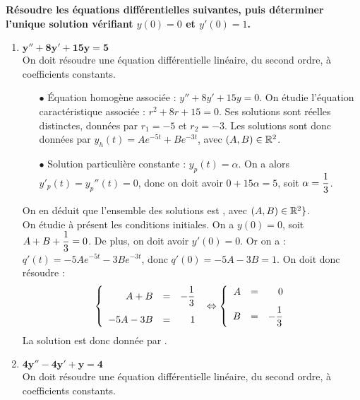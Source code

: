 \documentclass[a4paper, 11pt,reqno]{article}
\begin{document}
\begin{correction}  \;
  \textbf{R\'esoudre les \'equations diff\'erentielles suivantes, puis d\'eterminer l'unique solution v\'erifiant $y(0)=0$ et $y'(0)=1$.}
  \begin{enumerate}
    \item $\mathbf{y''+8y'+15y=5}$\\
          On doit r\'esoudre une \'equation diff\'erentielle lin\'eaire, du second ordre, \`a coefficients constants.
          \begin{itemize}
            \item[$\bullet$] \'Equation homog\`ene associ\'ee : $ y''+8y'+15y= 0$. On \'etudie l'\'equation caract\'eristique associ\'ee : $r^2 + 8r+15=0$. Ses solutions sont r\'eelles distinctes, donn\'ees par $r_1=-5$ et $r_2=-3$. Les solutions sont donc donn\'ees par $y_h(t) = A e^{-5t} + B e^{-3t}$, avec $(A,B) \in \mathbb{R}^2$.
            \item[$\bullet$] Solution particuli\`ere constante : $y_p(t) = \alpha$. On a alors $y'_p(t) = y_p''(t) = 0$, donc on doit avoir $0 +15 \alpha = 5$, soit $\alpha = \displaystyle \frac{1}{3}$.
          \end{itemize}
          On en d\'eduit que l'ensemble des solutions est , avec $(A,B) \in \mathbb{R}^2\}$.\\
          On \'etudie \`a pr\'esent les conditions initiales. On a $y(0) = 0$, soit $A+B+\displaystyle \frac{1}{3}=0$. De plus, on doit avoir $y'(0)=0$. Or on a : $q'(t) = - 5 A  e^{-5t} - 3 B e^{-3t}$, donc $q'(0) = -5A-3B = 1$. On doit donc r\'esoudre :
          $$\left\{ \begin{array}{rcr}
              A+B     & = & -\ddp \frac{1}{3} \vsec \\
              -5A -3B & = & 1
            \end{array} \right. \; \Leftrightarrow \left\{ \begin{array}{rcr}
              A & = & 0 \vsec           \\
              B & = & -\ddp \frac{1}{3}
            \end{array} \right. $$
          La solution est donc donn\'ee par  .
    \item $\mathbf{4y''-4y'+y=4}$\\
          On doit r\'esoudre une \'equation diff\'erentielle lin\'eaire, du second ordre, \`a coefficients constants.

\end{enumerate}
\end{correction}
\end{document}
